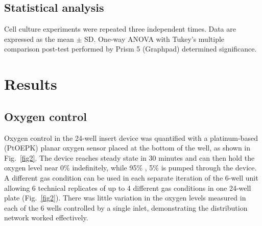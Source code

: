 \documentclass[10pt,letterpaper]{article}
\begin{document}
\subsection*{Statistical analysis}

Cell culture experiments were repeated three independent times. Data are expressed as the mean $\pm$ SD. One-way ANOVA with Tukey’s multiple comparison post-test performed by Prism 5 (Graphpad) determined significance.



\section*{Results}
\subsection*{Oxygen control}
Oxygen control in the 24-well insert device was quantified with a platinum-based (PtOEPK) planar oxygen sensor placed at the bottom of the well, as shown in Fig.~\ref{fig2}.
The device reaches steady state in 30 minutes and can then hold the oxygen level near 0\%  indefinitely, while 95\% , 5\%  is pumped through the device. 
A different gas condition can be used in each separate iteration of the 6-well unit allowing 6 technical replicates of up to 4 different gas conditions in one 24-well plate (Fig.~\ref{fig2}). There was little variation in the oxygen levels measured in each of the 6 wells controlled by a single inlet, demonstrating the distribution network worked effectively.
\end{document}
